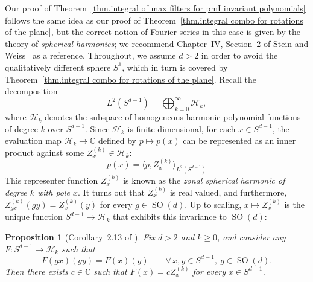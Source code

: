 \documentclass{article}
\theoremstyle{plain}
\newtheorem{proposition}[theorem]{Proposition}
\theoremstyle{definition}
\begin{document}
Our proof of Theorem~\ref{thm.integral of max filters for pmI invariant polynomials} follows the same idea as our proof of Theorem~\ref{thm.integral combo for rotations of the plane}, but the correct notion of Fourier series in this case is given by the theory of \textit{spherical harmonics};
we recommend Chapter~IV, Section~2 of Stein and Weiss~\cite{SteinW:71} as a reference.
Throughout, we assume $d>2$ in order to avoid the qualitatively different sphere $S^1$, which in turn is covered by Theorem~\ref{thm.integral combo for rotations of the plane}.
Recall the decomposition
\[
L^2(S^{d-1})
=\bigoplus_{k=0}^\infty\mathcal{H}_k,
\]
where $\mathcal{H}_k$ denotes the subspace of homogeneous harmonic polynomial functions of degree $k$ over $S^{d-1}$.
Since $\mathcal{H}_k$ is finite dimensional, for each $x\in S^{d-1}$, the evaluation map $\mathcal{H}_k\to\mathbb{C}$ defined by $p\mapsto p(x)$ can be represented as an inner product against some $Z_x^{(k)}\in\mathcal{H}_k$:
\begin{equation}
\label{eq.reproducing property}
p(x)
=\langle p,Z_x^{(k)}\rangle_{L^2(S^{d-1})}
\end{equation}
This representer function $Z_x^{(k)}$ is known as the \textit{zonal spherical harmonic of degree $k$ with pole $x$}.
It turns out that $Z_x^{(k)}$ is real valued, and furthermore, $Z_{gx}^{(k)}(gy)=Z_{x}^{(k)}(y)$ for every $g\in \operatorname{SO}(d)$.
Up to scaling, $x\mapsto Z_x^{(k)}$ is the unique function $S^{d-1}\to\mathcal{H}_k$ that exhibits this invariance to $\operatorname{SO}(d)$:

\begin{proposition}[Corollary~2.13 of {\cite[Chapter~IV]{SteinW:71}}]
\label{prop.zonal symmetry}
Fix $d>2$ and $k \geq 0$, and consider any $F\colon S^{d-1}\to\mathcal{H}_k$ such that
\[
F(gx)(gy)=F(x)(y)
\qquad
\forall\, x,y\in S^{d-1},~g\in \operatorname{SO}(d).
\]
Then there exists $c\in\mathbb{C}$ such that $F(x)=cZ_x^{(k)}$ for every $x\in S^{d-1}$.
\end{proposition}
\end{document}
